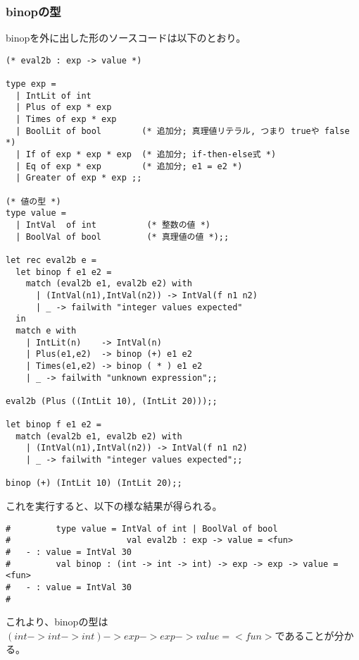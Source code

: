 \documentclass[a4paper,9pt]{jarticle}
\begin{document}
\subsubsection{binopの型}
binopを外に出した形のソースコードは以下のとおり。
\begin{lstlisting}
(* eval2b : exp -> value *)

type exp =
  | IntLit of int
  | Plus of exp * exp 
  | Times of exp * exp
  | BoolLit of bool        (* 追加分; 真理値リテラル, つまり trueや false  *)
  | If of exp * exp * exp  (* 追加分; if-then-else式 *)
  | Eq of exp * exp        (* 追加分; e1 = e2 *)
  | Greater of exp * exp ;;

(* 値の型 *)
type value =
  | IntVal  of int          (* 整数の値 *)
  | BoolVal of bool         (* 真理値の値 *);;

let rec eval2b e =
  let binop f e1 e2 =
    match (eval2b e1, eval2b e2) with
      | (IntVal(n1),IntVal(n2)) -> IntVal(f n1 n2)
      | _ -> failwith "integer values expected"
  in 
  match e with
    | IntLit(n)    -> IntVal(n)
    | Plus(e1,e2)  -> binop (+) e1 e2
    | Times(e1,e2) -> binop ( * ) e1 e2
    | _ -> failwith "unknown expression";;

eval2b (Plus ((IntLit 10), (IntLit 20)));;

let binop f e1 e2 =
  match (eval2b e1, eval2b e2) with
    | (IntVal(n1),IntVal(n2)) -> IntVal(f n1 n2)
    | _ -> failwith "integer values expected";;
        
binop (+) (IntLit 10) (IntLit 20);;
\end{lstlisting}
これを実行すると、以下の様な結果が得られる。

\begin{lstlisting}
#         type value = IntVal of int | BoolVal of bool
#                       val eval2b : exp -> value = <fun>
#   - : value = IntVal 30
#         val binop : (int -> int -> int) -> exp -> exp -> value = <fun>
#   - : value = IntVal 30
# 
\end{lstlisting}

これより、binopの型は$(int -> int -> int) -> exp -> exp -> value =
<fun>$であることが分かる。
\end{document}
